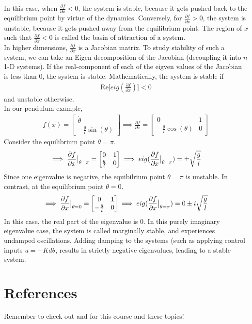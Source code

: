 \noindent
In this case, when $\frac{\partial f}{\partial x}<0$, the system is stable, because it gets pushed back to the equilibrium point by virtue of the dynamics. Conversely, for $\frac{\partial f}{\partial x}>0$, the system is unstable, because it gets pushed away from the equilibrium point.
The region of $x$ such that  $\frac{\partial f}{\partial x}<0$ is called the basin of attraction of a system.
\\

\noindent
In higher dimensions, $\frac{\partial f}{\partial x}$ is a Jacobian matrix. To study stability of such a system, we can take an Eigen decomposition of the Jacobian (decoupling it into $n$ 1-D systems). If the real-component of each of the eigven values of the Jacobian is less than $0$, the system is stable. Mathematically, the system is stable if
\begin{align}
    \textrm{Re} \big[ eig ( \frac{\partial f}{\partial x} ) \big] < 0 
\end{align}
and unstable otherwise. \\

\noindent
In our pendulum example, 
\begin{align}
    f(x) = \begin{bmatrix}
        \dot{\theta} \\
        - \frac{g}{l} \sin(\theta) 
    \end{bmatrix}
    \implies
    \frac{\partial f}{\partial x} = \begin{bmatrix}
        0 & 1 \\
        - \frac{g}{l} \cos(\theta) & 0
    \end{bmatrix}
\end{align}
Consider the equilibrium point $\theta=\pi$. 
\begin{align}
    \implies
        \evalat{\frac{\partial f}{\partial x}}{\theta=\pi} = \begin{bmatrix}
        0 & 1 \\
        \frac{g}{l} & 0
    \end{bmatrix}
    \implies
    eig(\evalat{\frac{\partial f}{\partial x}}{\theta=\pi}) = \pm \sqrt{\frac{g}{l}}
\end{align}
Since one eigenvalue is negative, the equibilrium point $\theta=\pi$ is unstable.
In contrast, at the equilibrium point $\theta=0$. 
\begin{align}
    \implies
        \evalat{\frac{\partial f}{\partial x}}{\theta=0} = \begin{bmatrix}
        0 & 1 \\
        - \frac{g}{l} & 0
    \end{bmatrix}
    \implies
    eig(\evalat{\frac{\partial f}{\partial x}}{\theta=\pi}) = 0 \pm i \sqrt{\frac{g}{l}}
\end{align}
In this case, the real part of the eigenvalue is $0$. In this purely imaginary eigenvalue case, the system is called marginally stable, and experiences undamped oscillations. 
Adding damping to the systems (such as applying control inputs $u = - K d \dot{\theta}$, results in strictly negative eigenvalues, leading to a stable system. 

\section{References}
Remember to check out \cite{spong2005robot} and \cite{strogatz2016nonlinear} for this course and these topics!

\printbibliography